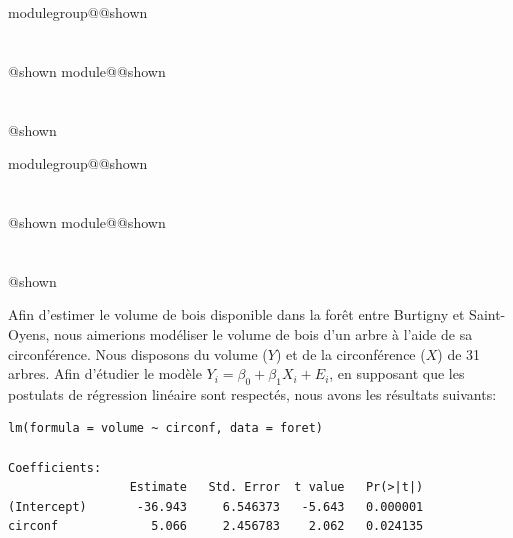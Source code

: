 \documentclass{Evaluation}
\makeatletter
\newcommand{\currentmodulekey}{}
\newcommand{\currentmoduletitle}{}
\newcommand{\currentgroupkey}{}
\newcommand{\currentgrouptitle}{}
\newcommand{\showmoduleifneeded}{%
  \ifx\currentgroupkey\empty\else
    \expandafter\ifx\csname modulegroup@\currentgroupkey @shown\endcsname\relax
      \section*{\currentgrouptitle}%
      \expandafter\gdef\csname modulegroup@\currentgroupkey @shown\endcsname{1}%
    \fi
  \fi
  \expandafter\ifx\csname module@\currentmodulekey @shown\endcsname\relax
    \section*{\currentmoduletitle}%
    \expandafter\gdef\csname module@\currentmodulekey @shown\endcsname{1}%
  \fi
}
\newenvironment{H24}{\showmoduleifneeded}{}
\newenvironment{A25}{\showmoduleifneeded}{}
\makeatother
\begin{document}
\begin{questions}
\begin{A25}

\end{A25}

\begin{H24}
\question {} %
Afin d'estimer le volume de bois disponible dans la forêt entre Burtigny et Saint-Oyens, nous aimerions modéliser le volume de bois d'un arbre à l'aide de sa circonférence. Nous disposons du volume ($Y$) et de la circonférence ($X$) de 31 arbres. Afin d'étudier le modèle $Y_i = \beta_0 + \beta_1 X_i + E_i$, en supposant que les postulats de régression linéaire sont respectés, nous avons les résultats suivants:

\begin{verbatim}
lm(formula = volume ~ circonf, data = foret)

Coefficients:
                 Estimate   Std. Error  t value   Pr(>|t|)
(Intercept)       -36.943     6.546373   -5.643   0.000001
circonf             5.066     2.456783    2.062   0.024135


\end{verbatim}
\end{H24}
\end{questions}
\end{document}
